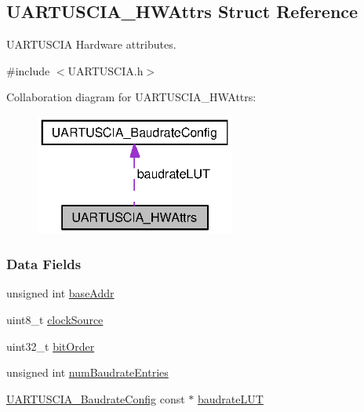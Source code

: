 \subsection{U\-A\-R\-T\-U\-S\-C\-I\-A\-\_\-\-H\-W\-Attrs Struct Reference}
\label{struct_u_a_r_t_u_s_c_i_a___h_w_attrs}


U\-A\-R\-T\-U\-S\-C\-I\-A Hardware attributes.  




{\ttfamily \#include $<$U\-A\-R\-T\-U\-S\-C\-I\-A.\-h$>$}



Collaboration diagram for U\-A\-R\-T\-U\-S\-C\-I\-A\-\_\-\-H\-W\-Attrs\-:
\nopagebreak
\begin{figure}[H]
\begin{center}
\leavevmode
\includegraphics[width=185pt]{struct_u_a_r_t_u_s_c_i_a___h_w_attrs__coll__graph}
\end{center}
\end{figure}
\subsubsection*{Data Fields}
\begin{DoxyCompactItemize}
\item 
unsigned int \hyperlink{struct_u_a_r_t_u_s_c_i_a___h_w_attrs_aceece5625f03db035c4602c1f67e8038}{base\-Addr}
\item 
uint8\-\_\-t \hyperlink{struct_u_a_r_t_u_s_c_i_a___h_w_attrs_a4aec72a0ebaedd4a4972448aa01a2250}{clock\-Source}
\item 
uint32\-\_\-t \hyperlink{struct_u_a_r_t_u_s_c_i_a___h_w_attrs_ac37864896a2d13ca7989076a125f1bd0}{bit\-Order}
\item 
unsigned int \hyperlink{struct_u_a_r_t_u_s_c_i_a___h_w_attrs_ae73e37878acb0ca3f0c5b4209af6dc55}{num\-Baudrate\-Entries}
\item 
\hyperlink{struct_u_a_r_t_u_s_c_i_a___baudrate_config}{U\-A\-R\-T\-U\-S\-C\-I\-A\-\_\-\-Baudrate\-Config} const $\ast$ \hyperlink{struct_u_a_r_t_u_s_c_i_a___h_w_attrs_a5c2588fa1527626c8c6711f825cc96bd}{baudrate\-L\-U\-T}
\end{DoxyCompactItemize}


